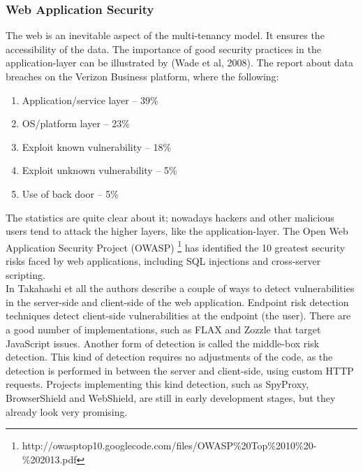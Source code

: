 \subsubsection{Web Application Security}
The web is an inevitable aspect of the multi-tenancy model. It ensures the accessibility of the data. The importance of good security practices in the application-layer can be illustrated by (Wade et al, 2008). The report about data breaches on the Verizon Business platform, where the following:\\
\begin{enumerate}
    \item Application/service layer – 39\%
    \item OS/platform layer – 23\%
    \item Exploit known vulnerability – 18\%
    \item Exploit unknown vulnerability – 5\%
    \item Use of back door – 5\%
\end{enumerate}
The statistics are quite clear about it; nowadays hackers and other malicious users tend to attack the higher layers, like the application-layer. The Open Web Application Security Project (OWASP) \footnote{http://owasptop10.googlecode.com/files/OWASP\%20Top\%2010\%20-\%202013.pdf} has identified the 10 greatest security risks faced by web applications, including SQL injections and cross-server scripting. \\
In Takahashi et all\cite{Takahashi2012Security} the authors describe a couple of ways to detect vulnerabilities in the server-side and client-side of the web application. Endpoint risk detection techniques detect client-side vulnerabilities at the endpoint (the user). There are a good number of implementations, such as FLAX and Zozzle that target JavaScript issues. Another form of detection is called the middle-box risk detection. This kind of detection requires no adjustments of the code, as the detection is performed in between the server and client-side, using custom HTTP requests. Projects implementing this kind detection, such as SpyProxy, BrowserShield and WebShield, are still in early development stages, but they already look very promising.

